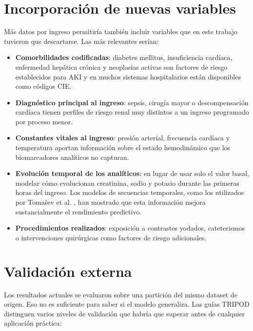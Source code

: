 \documentclass[12pt, a4paper, oneside]{report}
\begin{document}
\section{Incorporación de nuevas variables}

Más datos por ingreso permitiría también incluir variables que en este trabajo tuvieron que descartarse. Las más relevantes serían:

\begin{itemize}
    \item \textbf{Comorbilidades codificadas}: diabetes mellitus, insuficiencia cardíaca, enfermedad hepática crónica y neoplasias activas son factores de riesgo establecidos para AKI \parencite{kellum2021acute} y en muchos sistemas hospitalarios están disponibles como códigos CIE.
    
    \item \textbf{Diagnóstico principal al ingreso}: sepsis, cirugía mayor o descompensación cardíaca tienen perfiles de riesgo renal muy distintos a un ingreso programado por proceso menor.
    
    \item \textbf{Constantes vitales al ingreso}: presión arterial, frecuencia cardíaca y temperatura aportan información sobre el estado hemodinámico que los biomarcadores analíticos no capturan.
    
    \item \textbf{Evolución temporal de los analíticos}: en lugar de usar solo el valor basal, modelar cómo evolucionan creatinina, sodio y potasio durante las primeras horas del ingreso. Los modelos de secuencias temporales, como los utilizados por Tomašev et al. \parencite{tomasev2019nature}, han mostrado que esta información mejora sustancialmente el rendimiento predictivo.
    
    \item \textbf{Procedimientos realizados}: exposición a contrastes yodados, cateterismos o intervenciones quirúrgicas como factores de riesgo adicionales.
\end{itemize}

\section{Validación externa}

Los resultados actuales se evaluaron sobre una partición del mismo dataset de origen. Eso no es suficiente para saber si el modelo generaliza. Las guías TRIPOD \parencite{collins2015tripod} distinguen varios niveles de validación que habría que superar antes de cualquier aplicación práctica:
\end{document}
